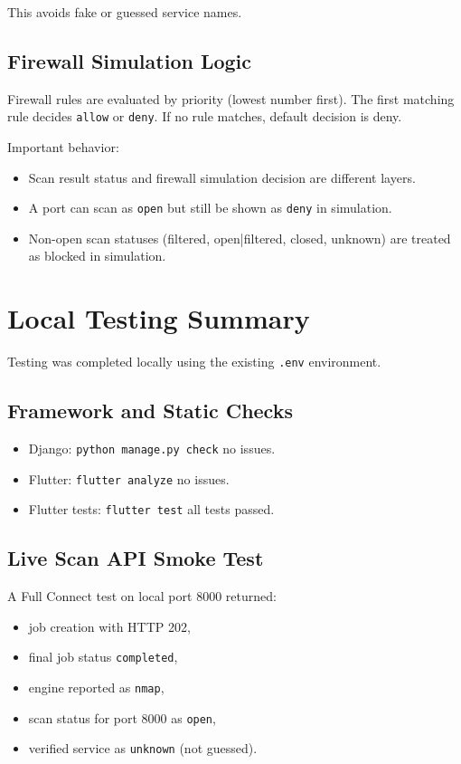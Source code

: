 \documentclass[12pt,a4paper]{article}
\begin{document}
This avoids fake or guessed service names.

\subsection{Firewall Simulation Logic}
Firewall rules are evaluated by priority (lowest number first). The first matching rule decides \texttt{allow} or \texttt{deny}. If no rule matches, default decision is deny.

Important behavior:
\begin{itemize}[leftmargin=*]
  \item Scan result status and firewall simulation decision are different layers.
  \item A port can scan as \texttt{open} but still be shown as \texttt{deny} in simulation.
  \item Non-open scan statuses (filtered, open|filtered, closed, unknown) are treated as blocked in simulation.
\end{itemize}

\section{Local Testing Summary}
Testing was completed locally using the existing \texttt{.env} environment.

\subsection{Framework and Static Checks}
\begin{itemize}[leftmargin=*]
  \item Django: \texttt{python manage.py check} \textrightarrow{} no issues.
  \item Flutter: \texttt{flutter analyze} \textrightarrow{} no issues.
  \item Flutter tests: \texttt{flutter test} \textrightarrow{} all tests passed.
\end{itemize}

\subsection{Live Scan API Smoke Test}
A Full Connect test on local port 8000 returned:
\begin{itemize}[leftmargin=*]
  \item job creation with HTTP 202,
  \item final job status \texttt{completed},
  \item engine reported as \texttt{nmap},
  \item scan status for port 8000 as \texttt{open},
  \item verified service as \texttt{unknown} (not guessed).
\end{itemize}
\end{document}
